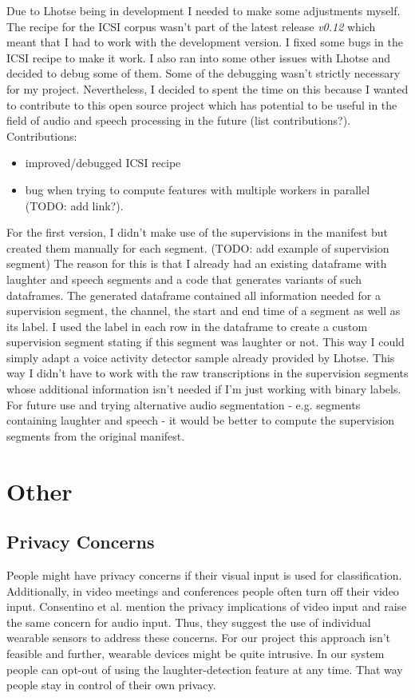 \documentclass[bsc,frontabs,parskip,deptreport]{infthesis}
\begin{document}
Due to Lhotse being in development I needed to make some adjustments myself. The recipe for the ICSI corpus wasn't part of the latest release \textit{v0.12} which meant that I had to work with the development version. I fixed some bugs in the ICSI recipe to make it work. I also ran into some other issues with Lhotse and decided to debug some of them. Some of the debugging wasn't strictly necessary for my project. Nevertheless, I decided to spent the time on this because I wanted to contribute to this open source project which has potential to be useful in the field of audio and speech processing in the future (list contributions?).
Contributions: 
\begin{itemize}
    \item improved/debugged ICSI recipe 
    \item bug when trying to compute features with multiple workers in parallel (TODO: add link?).
\end{itemize}

For the first version, I didn't make use of the supervisions in the manifest but created them manually 
for each segment. (TODO: add example of supervision segment)
The reason for this is that I already had an existing dataframe with laughter and speech segments and a code that generates variants of such dataframes.
The generated dataframe contained all information needed for a supervision segment, the channel, the start and end time of a segment as well as its label. 
I used the label in each row in the dataframe to create a custom supervision segment stating if this segment was laughter or not. 
This way I could simply adapt a voice activity detector sample already provided by Lhotse. This way I didn't have to work with the raw transcriptions in the supervision segments whose additional information isn't needed if I'm just working with binary labels. 
For future use and trying alternative audio segmentation - e.g. segments containing laughter and speech - it would be better to compute the supervision segments from the original manifest.  

\chapter{Other}
\section{Privacy Concerns}\label{privacy-concerns}
People might have privacy concerns if their visual input is used for classification.
Additionally, in video meetings and conferences people often turn off their video input.
Consentino et al. \cite{cosentino2016quantitative}  mention the privacy implications of video input and raise the same concern for audio input.
Thus, they suggest the use of individual wearable sensors to address these concerns.
For our project this approach isn't feasible and further, wearable devices might be quite intrusive.
In our system people can opt-out of using the laughter-detection feature at any time.
That way people stay in control of their own privacy.
\end{document}
